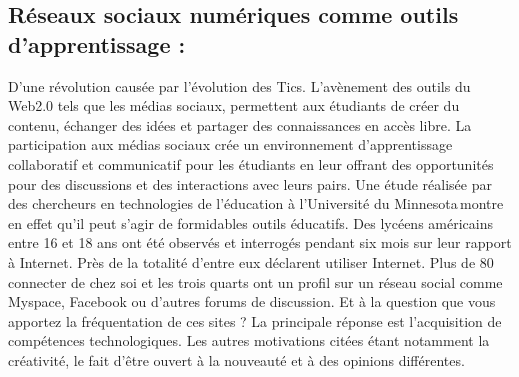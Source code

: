 \documentclass[12pt,a4paper,titlepage]{article}
\begin{document}
\subsection{Réseaux sociaux numériques comme outils d’apprentissage :}
D’une révolution causée par l’évolution des Tics. L’avènement des outils du Web2.0
tels que les médias sociaux, permettent aux étudiants de créer du contenu, échanger
des idées et partager des connaissances en accès libre. La participation aux médias
sociaux crée un environnement d’apprentissage collaboratif et communicatif pour les
étudiants en leur offrant des opportunités pour des discussions et des interactions avec leurs
pairs. \newline
Une étude réalisée par des chercheurs en technologies de l’éducation à l’Université du
Minnesota montre en effet qu’il peut s’agir de formidables outils éducatifs. Des lycéens
américains entre 16 et 18 ans ont été observés et interrogés pendant six mois sur leur rapport
à Internet. Près de la totalité d’entre eux déclarent utiliser Internet. Plus de 80 %
connecter de chez soi et les trois quarts ont un profil sur un réseau social comme Myspace,
Facebook ou d’autres forums de discussion. \newline
Et à la question que vous apportez la fréquentation de ces sites ? La principale réponse est
l’acquisition de compétences technologiques. Les autres motivations citées étant notamment
la créativité, le fait d’être ouvert à la nouveauté et à des opinions différentes. \newline
\end{document}
